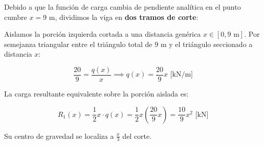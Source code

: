 


Debido a que la función de carga cambia de pendiente analítica en el punto cumbre $x = 9\text{ m}$, dividimos la viga en \textbf{dos tramos de corte}:






Aislamos la porción izquierda cortada a una distancia genérica $x \in [0, 9\text{ m}]$. Por semejanza triangular entre el triángulo total de $9\text{ m}$ y el triángulo seccionado a distancia $x$:

\begin{equation}

    \frac{20}{9} = \frac{q(x)}{x} \implies \boxed{q(x) = \frac{20}{9}x\text{ [kN/m]}}

\end{equation}

La carga resultante equivalente sobre la porción aislada es:

\begin{equation}

    R_1(x) = \frac{1}{2} x \cdot q(x) = \frac{1}{2} x \left(\frac{20}{9}x\right) = \frac{10}{9}x^2\text{ [kN]}

\end{equation}

Su centro de gravedad se localiza a $\frac{x}{3}$ del corte.



